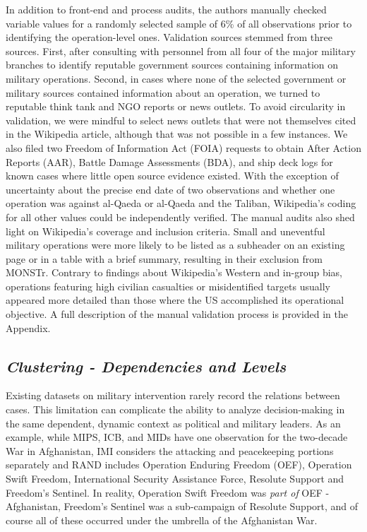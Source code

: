 \documentclass[fleqn,12pt]{article}
\begin{document}
In addition to front-end and process audits, the authors manually checked variable values for a randomly selected sample of 6\% of all observations prior to identifying the operation-level ones. Validation sources stemmed from three sources. First, after consulting with personnel from all four of the major military branches to identify reputable government sources containing information on military operations. Second, in cases where none of the selected government or military sources contained information about an operation, we turned to reputable think tank and NGO reports or news outlets. To avoid circularity in validation, we were mindful to select news outlets that were not themselves cited in the Wikipedia article, although that was not possible in a few instances. We also filed two Freedom of Information Act (FOIA) requests to obtain After Action Reports (AAR), Battle Damage Assessments (BDA), and ship deck logs for known cases where little open source evidence existed. With the exception of uncertainty about the precise end date of two observations and whether one operation was against al-Qaeda or al-Qaeda and the Taliban, Wikipedia's coding for all other values could be independently verified. The manual audits also shed light on Wikipedia's coverage and inclusion criteria. Small and uneventful military operations were more likely to be listed as a subheader on an existing page or in a table with a brief summary, resulting in their exclusion from MONSTr. Contrary to findings about Wikipedia's Western and in-group bias, operations featuring high civilian casualties or misidentified targets usually appeared more detailed than those where the US accomplished its operational objective. A full description of the manual validation process is provided in the Appendix.

\subsection*{\textit{Clustering - Dependencies and Levels}}
Existing datasets on military intervention rarely record the relations between cases. This limitation can complicate the ability to analyze decision-making in the same dependent, dynamic context as political and military leaders. As an example, while MIPS, ICB, and MIDs have one observation for the two-decade War in Afghanistan, IMI considers the attacking and peacekeeping portions separately and RAND includes Operation Enduring Freedom (OEF), Operation Swift Freedom, International Security Assistance Force, Resolute Support and Freedom's Sentinel. In reality, Operation Swift Freedom was \textit{part of} OEF - Afghanistan, Freedom's Sentinel was a sub-campaign of Resolute Support, and of course all of these occurred under the umbrella of the Afghanistan War.
\end{document}
